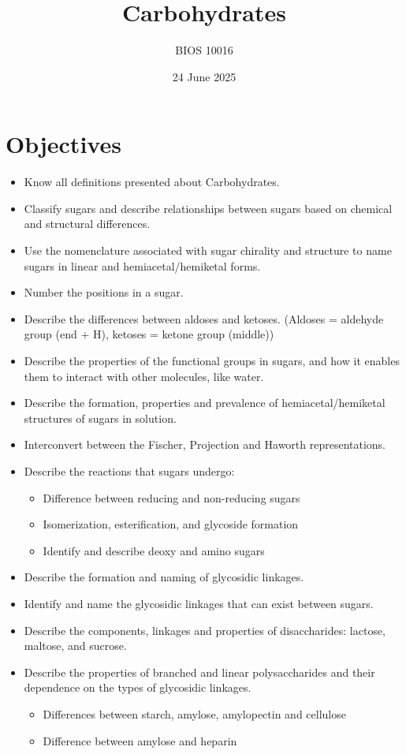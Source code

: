 \documentclass[letterpaper, 12pt]{article}
\title{Carbohydrates}
\author{BIOS 10016}
\date{24 June 2025}
\begin{document}
\maketitle

\section*{Objectives}

\begin{itemize}
\item Know all definitions presented about Carbohydrates.
\item Classify sugars and describe relationships between sugars based on chemical and structural differences.
\item Use the nomenclature associated with sugar chirality and structure to name sugars in linear and hemiacetal/hemiketal forms.
\item Number the positions in a sugar.
\item Describe the differences between aldoses and ketoses. (Aldoses = aldehyde group (end + H), ketoses = ketone group (middle))
\item Describe the properties of the functional groups in sugars, and how it enables them to interact with other molecules, like water.
\item Describe the formation, properties and prevalence of hemiacetal/hemiketal structures of sugars in solution.
\item Interconvert between the Fischer, Projection and Haworth representations.
\item Describe the reactions that sugars undergo:
\begin{itemize}
\item Difference between reducing and non-reducing sugars
\item Isomerization, esterification, and glycoside formation
\item Identify and describe deoxy and amino sugars
\end{itemize}
\item Describe the formation and naming of glycosidic linkages.
\item Identify and name the glycosidic linkages that can exist between sugars.
\item Describe the components, linkages and properties of disaccharides: lactose, maltose, and sucrose.
\item Describe the properties of branched and linear polysaccharides and their
dependence on the types of glycosidic linkages.
\begin{itemize}
\item Differences between starch, amylose, amylopectin and cellulose
\item Difference between amylose and heparin
\end{itemize}
\end{itemize}
\end{document}
